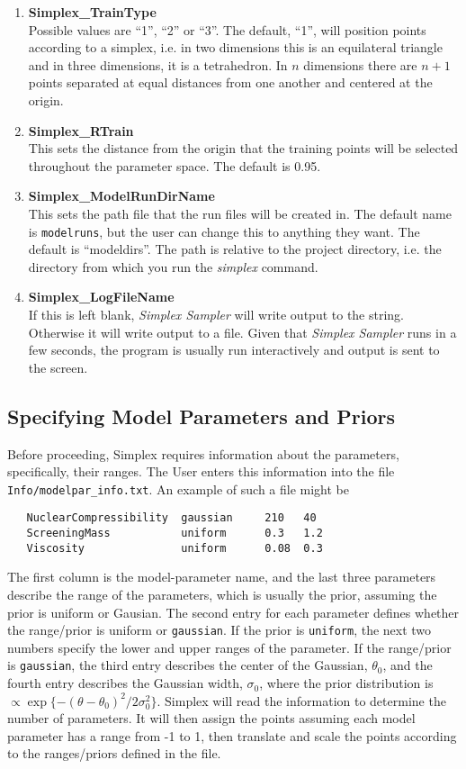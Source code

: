 \documentclass[main.tex]{subfiles}
\begin{document}
\begin{enumerate}\itemsep 0pt
    \item {\bf Simplex\_TrainType}\\
Possible values are ``1'', ``2'' or ``3''. The default, ``1'', will position points according to a simplex, i.e. in two dimensions this is an equilateral triangle and in three dimensions, it is a tetrahedron. In $n$ dimensions there are $n+1$ points separated at equal distances from one another and centered at the origin. 
\item {\bf Simplex\_RTrain}\\
This sets the distance from the origin that the training points will be selected throughout the parameter space. The default is 0.95.
\item {\bf Simplex\_ModelRunDirName}\\
This sets the path file that the run files will be created in. The default name is {\tt{modelruns}}, but the user can change this to anything they want. The default is ``modeldirs''. The path is relative to the project directory, i.e. the directory from which you run the {\it simplex} command.
\item {\bf Simplex\_LogFileName}\\
If this is left blank, {\it Simplex Sampler} will write output to the string. Otherwise it will write output to a file. Given that {\it Simplex Sampler} runs in a few seconds, the program is usually run interactively and output is sent to the screen.
\end{enumerate}

\subsection{Specifying Model Parameters and Priors}\label{subsec:modelparinfo}
Before proceeding, Simplex requires information about the parameters, specifically, their ranges. The User enters this information into the file {\tt Info/modelpar\_info.txt}. An example of such a file might be
{\tt\begin{verbatim}
   NuclearCompressibility  gaussian     210   40
   ScreeningMass           uniform      0.3   1.2
   Viscosity               uniform      0.08  0.3
\end{verbatim}
}
The first column is the model-parameter name, and the last three parameters describe the range of the parameters, which is usually the prior, assuming the prior is uniform or Gausian. The second entry for each parameter defines whether the range/prior is uniform or {\tt gaussian}. If the prior is {\tt uniform}, the next two numbers specify the lower and upper ranges of the parameter. If the range/prior is {\tt gaussian}, the third entry describes the center of the Gaussian, $\theta_0$, and the fourth entry describes the Gaussian width, $\sigma_0$, where the prior distribution is $\propto \exp\{-(\theta-\theta_0)^2/2\sigma_0^2\}$. Simplex will read the information to determine the number of parameters. It will then assign the points assuming each model parameter has a range from -1 to 1, then translate and scale the points according to the ranges/priors defined in the file.
\end{document}
